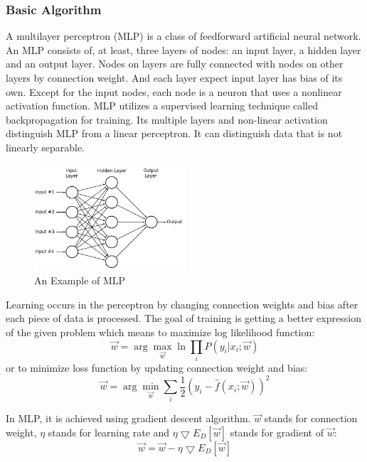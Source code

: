 \documentclass[a4paper]{article}
\begin{document}
\subsubsection{Basic Algorithm}
A multilayer perceptron (MLP) is a class of feedforward artificial neural network. An MLP consists of, at least, three layers of nodes: an input layer, a hidden layer and an output layer. Nodes on layers are fully connected with nodes on other layers by connection weight. And each layer expect input layer has bias of its own. Except for the input nodes, each node is a neuron that uses a nonlinear activation function. MLP utilizes a supervised learning technique called backpropagation for training.\cite{nano7}\cite{nano8} Its multiple layers and non-linear activation distinguish MLP from a linear perceptron. It can distinguish data that is not linearly separable.\cite{nano9}
\begin{figure}[H]
\centering
\includegraphics[width=0.5\textwidth]{MLP.png}
\caption{\label{fig:frog}An Example of MLP}
\end{figure}
Learning occurs in the perceptron by changing connection weights and bias after each piece of data is processed. The goal of training is getting a better expression of the given problem which means to maximize log likelihood function:
$$\overrightarrow{w} = \arg\max_{\overrightarrow{w}}\ln\prod_iP(y_i|x_i;\overrightarrow{w})$$
or to minimize loss function by updating connection weight and bias:
$$\overrightarrow{w} = \arg\min_{\overrightarrow{w}}\sum_i \frac{1}{2}(y_i-\widehat{f}(x_i;\overrightarrow{w}))^2$$

In MLP, it is achieved using gradient descent algorithm. $\overrightarrow{w}$ stands for connection weight, $\eta$ stands for learning rate and $ \eta \bigtriangledown E_{D}[\overrightarrow{w}]$ stands for gradient of $\overrightarrow{w}$:
$$\overrightarrow{w} = \overrightarrow{w} - \eta \bigtriangledown E_{D}[\overrightarrow{w}]$$
\end{document}
